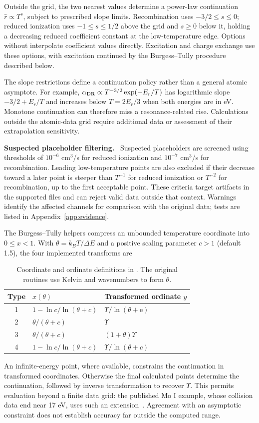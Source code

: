 \documentclass[11pt,a4paper]{article}
\newcommand{\code}[1]{\texttt{\detokenize{#1}}}
\newcommand{\ee}{\mathrm{e}}
\newenvironment{implnote}[1][Implementation]{%
  \par\smallskip\noindent\begin{lrbox}{\notebox}\setlength{\fboxsep}{6pt}\begin{minipage}{\dimexpr\linewidth-2\fboxsep-2\fboxrule\relax}\small\textbf{#1.}\ }{%
  \end{minipage}\end{lrbox}\setlength{\fboxsep}{6pt}\fcolorbox{noteframe}{notebg}{\usebox{\notebox}}\par\smallskip}
\numberwithin{equation}{section}
\begin{document}
Outside the grid, the two nearest values determine a power-law
continuation $\widehat r\propto T^s$, subject to prescribed slope
limits. Recombination uses $-3/2\le s\le0$; reduced ionization uses
$-1\le s\le1/2$ above the grid and $s\ge0$ below it, holding a
decreasing reduced coefficient constant at the low-temperature edge.
Options without \code{loglog} interpolate coefficient values directly.
Excitation and charge exchange use these options, with excitation
continued by the Burgess--Tully procedure described below.

The slope restrictions define a continuation policy rather than a
general atomic asymptote. For example,
$\alpha_{\rm DR}\propto T^{-3/2}\exp(-E_r/T)$ has logarithmic slope
$-3/2+E_r/T$ and increases below $T=2E_r/3$ when both energies are
in eV. Monotone continuation can therefore miss a resonance-related
rise. Calculations outside the atomic-data grid require additional
data or assessment of their extrapolation sensitivity.

\begin{implnote}[Suspected placeholder filtering]
Suspected placeholders are screened using thresholds of $10^{-6}$
cm$^3$/s for reduced ionization and $10^{-7}$ cm$^3$/s for
recombination. Leading low-temperature points are also excluded if
their decrease toward a later point is steeper than $T^{-1}$ for
reduced ionization or $T^{-2}$ for recombination, up to the first
acceptable point. These criteria target artifacts in the supported
files and can reject valid data outside that context. Warnings
identify the affected channels for comparison with the original
data; tests are listed in Appendix~\ref{app:evidence}.
\end{implnote}

The Burgess--Tully helpers compress an unbounded temperature coordinate into
$0\le x<1$. With $\theta=k_BT/\Delta E$ and a positive scaling parameter
$c>1$ (default 1.5), the four implemented transforms are
\begin{table}[htbp]\centering
\begin{tabular}{cll}\toprule Type & $x(\theta)$ & Transformed ordinate $y$\\\midrule
1 & $1-\ln c/\ln(\theta+c)$ & $\Upsilon/\ln(\theta+\ee)$\\
2 & $\theta/(\theta+c)$ & $\Upsilon$\\
3 & $\theta/(\theta+c)$ & $(1+\theta)\Upsilon$\\
4 & $1-\ln c/\ln(\theta+c)$ & $\Upsilon/\ln(\theta+c)$\\\bottomrule
\end{tabular}
\caption{Coordinate and ordinate definitions in \code{burgess_tully_rates.py}.
The original routines use Kelvin and wavenumbers to form $\theta$.}
\end{table}
An infinite-energy point, where available, constrains the continuation
in transformed coordinates. Otherwise the final calculated points
determine the continuation, followed by inverse transformation to
recover $\Upsilon$. This permits evaluation beyond a finite data grid:
the published Mo I example, whose collision data end near 17 eV,
uses such an extension~\cite{johnson}. Agreement with an asymptotic
constraint does not establish accuracy far outside the computed range.
\end{document}
